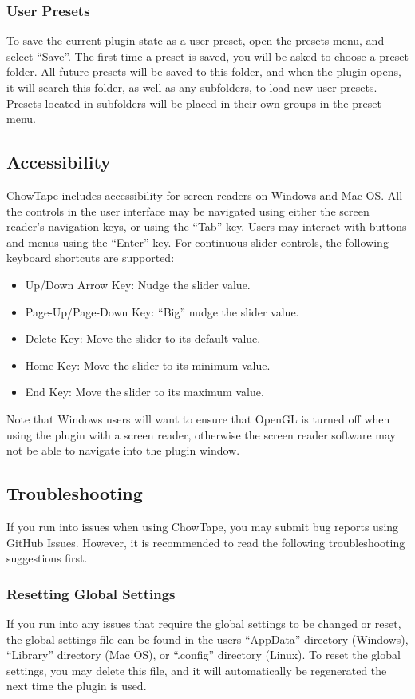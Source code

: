 \documentclass[landscape,twocolumn,a5paper]{manual}
\begin{document}
\subsubsection{User Presets}
To save the current plugin state as a user preset, open
the presets menu, and select ``Save''. The first time a
preset is saved, you will be asked to choose a preset
folder. All future presets will be saved to this folder,
and when the plugin opens, it will search this folder, as
well as any subfolders, to load new user presets.
Presets located in subfolders will be placed in their
own groups in the preset menu.
\newline

\subsection{Accessibility}
ChowTape includes accessibility for screen readers on Windows
and Mac OS. All the controls in the user interface may be navigated
using either the screen reader's navigation keys, or using the ``Tab''
key. Users may interact with buttons and menus using the ``Enter'' key.
For continuous slider controls, the following keyboard shortcuts are
supported:
\renewcommand{\labelitemi}{\textendash}
\begin{itemize}
    \itemsep-1mm
    \item Up/Down Arrow Key: Nudge the slider value.
    \item Page-Up/Page-Down Key: ``Big'' nudge the slider value.
    \item Delete Key: Move the slider to its default value.
    \item Home Key: Move the slider to its minimum value.
    \item End Key: Move the slider to its maximum value.
\end{itemize}
%
Note that Windows users will want to ensure that OpenGL is turned off
when using the plugin with a screen reader, otherwise the screen reader
software may not be able to navigate into the plugin window.

\subsection{Troubleshooting}
If you run into issues when using ChowTape, you may submit bug reports
using GitHub Issues. However, it is recommended to read the following
troubleshooting suggestions first.

\subsubsection{Resetting Global Settings}
If you run into any issues that require the global settings to
be changed or reset, the global settings file can be found in the
users ``AppData'' directory (Windows), ``Library'' directory (Mac OS),
or ``.config'' directory (Linux). To reset the global settings, you may
delete this file, and it will automatically be regenerated the next time
the plugin is used.
\end{document}
